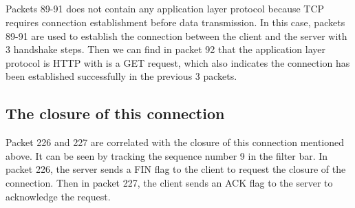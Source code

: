 \documentclass{article}
\begin{document}
\begin{CJK*}{UTF8}{gbsn}
\subsection{}
Packets 89-91 does not contain any application layer protocol because
TCP requires connection establishment before data transmission. In this case,
packets 89-91 are used to establish the connection between the client and the server
with 3 handshake steps. Then we can find in packet 92 that the application layer
protocol is HTTP with is a GET request,
which also indicates the connection has been established successfully
in the previous 3 packets.

\subsection{The closure of this connection}
Packet 226 and 227 are correlated with the closure of this connection mentioned above.
It can be seen by tracking the sequence number 9 in the filter bar. In packet 226, the
server sends a FIN flag to the client to request the closure of the connection.
Then in packet 227, the client sends an ACK flag to the server to acknowledge the
request.

\end{CJK*}
\end{document}
